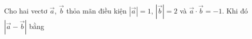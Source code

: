 \begin{ex}
Cho hai vectơ $\vec a$, $\vec b$ thỏa mãn điều kiện $|\vec a|=1$, $|\vec b|=2$ và $\vec a\cdot\vec b=-1$. Khi đó $|\vec a-\vec b|$ bằng
\end{ex}

